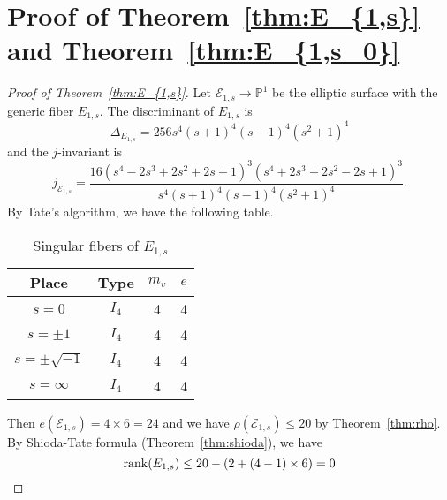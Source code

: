 \documentclass[main]{subfiles}
\begin{document}
\section{Proof of Theorem~\ref{thm:E_{1,s}} and Theorem~\ref{thm:E_{1,s_0}}}

\begin{proof}[Proof of Theorem~\ref{thm:E_{1,s}}]

    Let $\mathcal{E}_{1,s} \to \mathbb{P}^{1}$ be the elliptic surface with the generic fiber $E_{1,s}$.
    The discriminant of $E_{1,s}$ is
    \begin{equation}
        \label{eq:discriminant1s}
        \Delta_{E_{1,s}} = 256s^{4} (s + 1)^{4} (s - 1)^{4} (s^{2} + 1)^{4}
    \end{equation}
    and the $j$-invariant is
    \begin{equation*}
        j_{\mathcal{E}_{1,s}} = \frac{16 (s^{4} - 2 s^{3} + 2 s^{2} + 2 s + 1)^{3} (s^{4} + 2 s^{3} + 2 s^{2} - 2 s + 1)^{3}}{s ^{4} (s + 1)^{4} (s - 1)^{4}(s^{2} + 1)^{4}}.
    \end{equation*}
    By Tate's algorithm, we have the following table.
    \begin{table}[ht]
        \centering
        \caption{Singular fibers of $E_{1,s}$}
        \begin{tabular}{|c|c|c|c|}
            \hline
            Place             & Type  & $m_v$ & $e$ \\
            \hline
            $s=0$             & $I_4$ & 4     & 4   \\
            $s=\pm 1$         & $I_4$ & 4     & 4   \\
            $s=\pm \sqrt{-1}$ & $I_4$ & 4     & 4   \\
            $s=\infty$        & $I_4$ & 4     & 4   \\
            \hline
        \end{tabular}
    \end{table}

    Then $e(\mathcal{E}_{1,s}) = 4 \times 6 = 24$ and we have $\rho(\mathcal{E}_{1,s}) \leq 20$ by Theorem~\ref{thm:rho}.
    By Shioda-Tate formula (Theorem~\ref{thm:shioda}), we have
    \begin{equation*}
        \operatorname{rank}(E_{1,s}) \leq 20 - (2 + (4 - 1) \times 6) = 0
    \end{equation*}


\end{proof}
\end{document}
